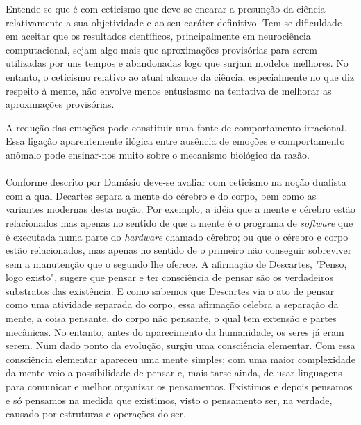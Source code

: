 Entende-se que é com ceticismo que deve-se encarar a presunção da ciência relativamente a sua objetividade e ao seu caráter definitivo. Tem-se dificuldade em aceitar que os resultados científicos, principalmente em neurociência computacional, sejam algo mais que aproximações provisórias para serem utilizadas por uns tempos e abandonadas logo que surjam modelos melhores. No entanto, o ceticismo relativo ao atual alcance da ciência, especialmente no que diz respeito à mente, não envolve menos entusiasmo na tentativa de melhorar as aproximações provisórias.


A redução das emoções pode constituir uma fonte de comportamento irracional. Essa ligação aparentemente ilógica entre ausência de emoções e comportamento anômalo pode ensinar-nos muito sobre o mecanismo biológico da razão.


\paragraph{}Conforme descrito por Damásio \cite{Damasio96} deve-se avaliar com ceticismo na noção dualista com a qual Decartes separa a mente do cérebro e do corpo, bem como as variantes modernas desta noção. Por exemplo, a idéia que a mente e cérebro estão relacionados mas apenas no sentido de que a mente é o programa de \textit{software} que é executada numa parte do \textit{hardware} chamado cérebro; ou que o cérebro e corpo estão relacionados, mas apenas no sentido de o primeiro não conseguir sobreviver sem a manutenção que o segundo lhe oferece. A afirmação de Descartes, "Penso, logo existo", sugere que pensar e ter consciência de pensar são os verdadeiros substratos das existência. E como sabemos que Descartes via o ato de pensar como uma atividade separada do corpo, essa afirmação celebra a separação da mente, a coisa pensante, do corpo não pensante, o qual tem extensão e partes mecânicas.
No entanto, antes do aparecimento da humanidade, os seres já eram serem. Num dado ponto da evolução, surgiu uma consciência elementar. Com essa consciência elementar apareceu uma mente simples; com uma maior complexidade da mente veio a possibilidade de pensar e, mais tarse ainda, de usar linguagens para comunicar e melhor organizar os pensamentos. Existimos e depois pensamos e só pensamos na medida que existimos, visto o pensamento ser, na verdade, causado por estruturas e operações do ser.
